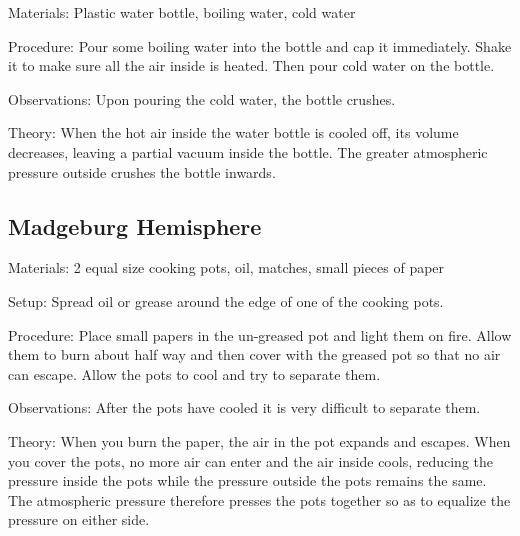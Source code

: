 \begin{multicols}{2}
\begin{description*}
\item[Materials:]{Plastic water bottle, boiling water, cold water}
\item[Procedure:]{Pour some boiling water into the bottle and cap it immediately. Shake it to make sure all the air inside is heated. Then pour cold water on the bottle.}
\item[Observations:]{Upon pouring the cold water, the bottle crushes.}
\item[Theory:]{When the hot air inside the water bottle is cooled off, its volume decreases, leaving a partial vacuum inside the bottle. The greater atmospheric pressure outside crushes the bottle inwards.}
\end{description*}

\subsection{Madgeburg Hemisphere}


\begin{description*}
\item[Materials:]{2 equal size cooking pots, oil, matches, small pieces of paper}
\item[Setup:]{Spread oil or grease around the edge of one of the cooking pots.}
\item[Procedure:]{Place small papers in the un-greased pot and light them on fire. Allow them to burn about half way and then cover with the greased pot so that no air can escape. Allow the pots to cool and try to separate them.}
\item[Observations:]{After the pots have cooled it is very difficult to separate them.}
\item[Theory:]{When you burn the paper, the air in the pot expands and escapes. When you cover the pots, no more air can enter and the air inside cools, reducing the pressure inside the pots while the pressure outside the pots remains the same. The atmospheric pressure therefore presses the pots together so as to equalize the pressure on either side. }
\end{description*}


\end{multicols}
